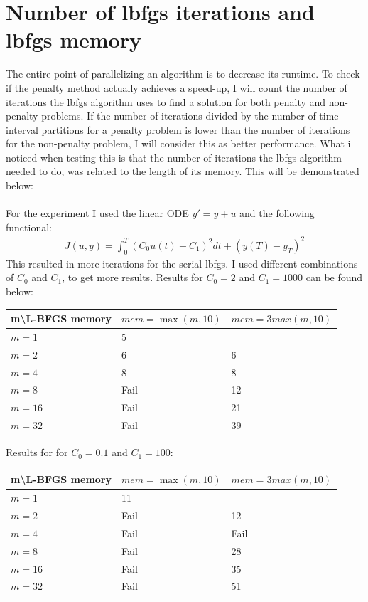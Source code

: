 \documentclass[11pt,a4paper]{article}
\begin{document}
\section*{Number of lbfgs iterations and lbfgs memory}
The entire point of parallelizing an algorithm is to decrease its runtime. To check if the penalty method actually achieves a speed-up, I will count the number of iterations the lbfgs algorithm uses to find a solution for both penalty and non-penalty problems. If the number of iterations divided by the number of time interval partitions for a penalty problem is lower than the number of iterations for the non-penalty problem, I will consider this as better performance. What i noticed when testing this is that the number of iterations the lbfgs algorithm needed to do, was related to the length of its memory. This will be demonstrated below: 
\\
\\   
For the experiment I used the linear ODE $y'=y+u$ and the following functional: 
\begin{align*}
J(u,y)=\int_0^T (C_0u(t)-C_1)^2dt + (y(T)-y_T)^2
\end{align*}
This resulted in more iterations for the serial lbfgs. I used different combinations of $C_0$ and $C_1$, to get more results. Results for $C_0=2 $ and $C_1= 1000$ can be found below:
\begin{center}
    \begin{tabular}{| l | l | l |}
    \hline
    m\textbackslash L-BFGS memory & $mem =\max(m,10)$& $mem=3max(m,10)$\\ \hline
    $m=1$  &  5 &  \\ \hline
    $m=2$  &  6 &  6	\\ \hline
    $m=4$ &  8 & 8 \\ \hline
    $m=8$ &  Fail &  12	\\ \hline
    $m=16$ &  Fail & 21 \\ \hline
    $m=32$ &  Fail &  39	\\ \hline
    \end{tabular}
\end{center}
Results for for $C_0=0.1 $ and $C_1= 100$:
\begin{center}
    \begin{tabular}{| l | l | l |}
    \hline
    m\textbackslash L-BFGS memory & $mem =\max(m,10)$& $mem=3max(m,10)$\\ \hline
    $m=1$  &  11 &  \\ \hline
    $m=2$  &  Fail &  12	\\ \hline
    $m=4$ &  Fail & Fail \\ \hline
    $m=8$ &  Fail &  28	\\ \hline
    $m=16$ &  Fail & 35 \\ \hline
    $m=32$ &  Fail &  51	\\ \hline
    \end{tabular}
\end{center}
\end{document}
